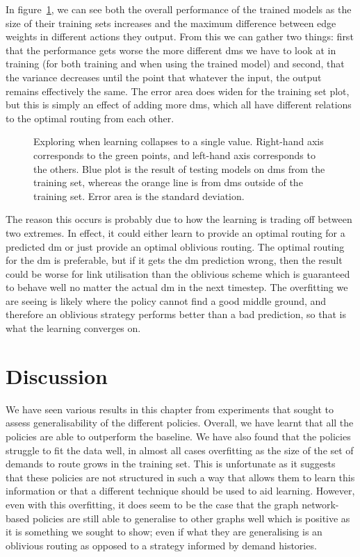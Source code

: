 In figure~\ref{fig:exp_fail}, we can see both the overall performance of the trained models as the size of their training sets increases and the maximum difference between edge weights in different actions they output. From this we can gather two things: first that the performance gets worse the more different \acp{dm} we have to look at in training (for both training and when using the trained model) and second, that the variance decreases until the point that whatever the input, the output remains effectively the same. The error area does widen for the training set plot, but this is simply an effect of adding more \acp{dm}, which all have different relations to the optimal routing from each other.

\begin{figure}
    \centering
    \resizebox{\textwidth}{!}{}
    \caption{Exploring when learning collapses to a single value. Right-hand axis corresponds to the green points, and left-hand axis corresponds to the others. Blue plot is the result of testing models on \acp{dm} from the training set, whereas the orange line is from \acp{dm} outside of the training set. Error area is the standard deviation.}
    \label{fig:exp_fail}
\end{figure}

The reason this occurs is probably due to how the learning is trading off between two extremes. In effect, it could either learn to provide an optimal routing for a predicted \ac{dm} or just provide an optimal oblivious routing. The optimal routing for the \ac{dm} is preferable, but if it gets the \ac{dm} prediction wrong, then the result could be worse for link utilisation than the oblivious scheme which is guaranteed to behave well no matter the actual \ac{dm} in the next timestep. The overfitting we are seeing is likely where the policy cannot find a good middle ground, and therefore an oblivious strategy performs better than a bad prediction, so that is what the learning converges on.


\section{Discussion}
We have seen various results in this chapter from experiments that sought to assess generalisability of the different policies. Overall, we have learnt that all the policies are able to outperform the baseline. We have also found that the policies struggle to fit the data well, in almost all cases overfitting as the size of the set of demands to route grows in the training set. This is unfortunate as it suggests that these policies are not structured in such a way that allows them to learn this information or that a different technique should be used to aid learning. However, even with this overfitting, it does seem to be the case that the graph network-based policies are still able to generalise to other graphs well which is positive as it is something we sought to show; even if what they are generalising is an oblivious routing as opposed to a strategy informed by demand histories.

